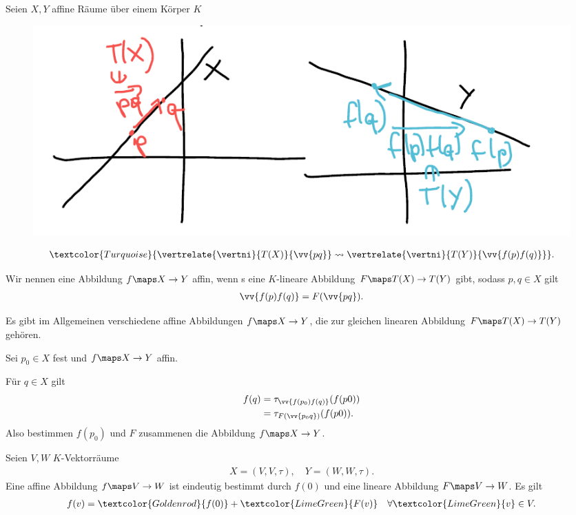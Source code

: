 Seien \( X, Y \) affine Räume über einem Körper \( K \)
\begin{figure}[H]
    \centering
    \includegraphics[width=0.8\linewidth]{figures/affine_Abbildungen}
    \label{fig:affine_Abbildungen}
\end{figure}
\begin{align*}
    \textcolor{Turquoise}{\vertrelate{\vertni}{T(X)}{\vv{pq}}\rightsquigarrow\vertrelate{\vertni}{T(Y)}{\vv{f(p)f(q)}}}.
\end{align*}
\begin{definition*}
    Wir nennen eine Abbildung \( f\maps X \to Y \) affin, wenn s eine \( K \)-lineare Abbildung \( F\maps T(X)\to T(Y) \) gibt, sodass \tforall \( p,q\in X \) gilt
    \begin{align*}
        \vv{f(p)f(q)}=F(\vv{pq}).
    \end{align*}
\end{definition*}
\begin{bemerkung*}
    \begin{eigenschaftenenumerate}
        \item Es gibt im Allgemeinen verschiedene affine Abbildungen \( f\maps X \to Y \), die zur gleichen linearen Abbildung \( F\maps T(X)\to T(Y) \) gehören.
        \item Sei \( p_0 \in X \) fest und \( f\maps X \to Y \) affin.
        
        Für \( q\in X \) gilt
        \begin{align*}
            f(q)\begin{aligned}[t] 
                &=\tau_{\vv{f(p_0)f(q)}}(f(p0))\\
            &=\tau_{F(\vv{p_0 q})}(f(p0)).
            \end{aligned}
        \end{align*}
        Also bestimmen \( f(p_0) \) und \( F \) zusammenen die Abbildung \( f\maps X\to Y \).
    \end{eigenschaftenenumerate}


\end{bemerkung*}
\begin{beispiel*}
    Seien \( V,W \) \( K \)-Vektorräume
    \begin{align*}
        X=(V,V,\tau),\quad Y=(W,W,\tau).
    \end{align*}
    Eine affine Abbildung \( f\maps V\to W \) ist eindeutig bestimmt durch \( f(0) \) und eine lineare Abbildung \( F\maps V\to W \). Es gilt
    \begin{align*}
        f(v)=\textcolor{Goldenrod}{f(0)}+\textcolor{LimeGreen}{F(v)}\quad\forall \textcolor{LimeGreen}{v} \in V.
    \end{align*}
\end{beispiel*}
